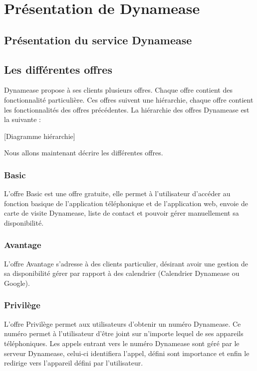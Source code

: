 \section{Présentation de Dynamease}

\subsection{Présentation du service Dynamease}

\subsection{Les différentes offres}

Dynamease propose à ses clients plusieurs offres. Chaque offre contient des fonctionnalité particulière. Ces offres suivent une hiérarchie, chaque offre contient les fonctionnalités des offres précédentes. La hiérarchie des offres Dynamease est la suivante :

[Diagramme hiérarchie]

Nous allons maintenant décrire les différentes offres.

\subsubsection{Basic}

L'offre Basic est une offre gratuite, elle permet à l'utilisateur d'accéder au fonction basique de l'application téléphonique et de l'application web, envoie de carte de visite Dynamease, liste de contact et pouvoir gérer manuellement sa disponibilité.

\subsubsection{Avantage}

L'offre Avantage s'adresse à des clients particulier, désirant avoir une gestion de sa disponibilité gérer par rapport à des calendrier (Calendrier Dynamease ou Google).

\subsubsection{Privilège}

L'offre Privilège permet aux utilisateurs d'obtenir un numéro Dynamease. Ce numéro permet à l'utilisateur d'être joint sur n'importe lequel de ses appareils téléphoniques. Les appels entrant vers le numéro Dynamease sont géré par le serveur Dynamease, celui-ci identifiera l'appel, défini sont importance et enfin le redirige vers l'appareil défini par l'utilisateur.

